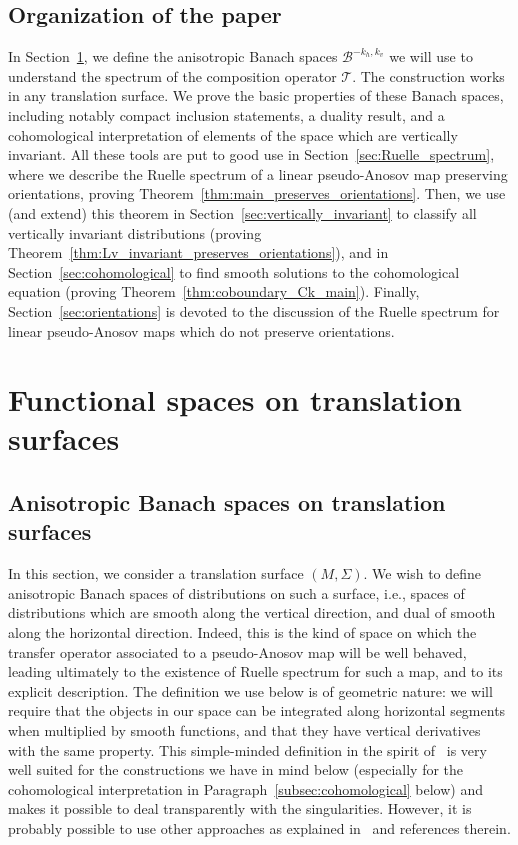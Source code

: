 \documentclass[11pt, a4paper, oneside, final, pagebackref]{amsart}
\newcommand{\boB}{\mathcal{B}}
\newcommand{\boT}{\mathcal{T}}
\theoremstyle{definition}
\numberwithin{equation}{section}
\begin{document}
\subsection*{Organization of the paper}
In Section~\ref{sec:def_boB}, we define the anisotropic Banach spaces
$\boB^{-k_h, k_v}$ we will use to understand the spectrum of the composition
operator $\boT$. The construction works in any translation surface. We prove
the basic properties of these Banach spaces, including notably compact
inclusion statements, a duality result, and a cohomological interpretation of
elements of the space which are vertically invariant. All these tools are put
to good use in Section~\ref{sec:Ruelle_spectrum}, where we describe the
Ruelle spectrum of a linear pseudo-Anosov map preserving orientations,
proving Theorem~\ref{thm:main_preserves_orientations}. Then, we use (and
extend) this theorem in Section~\ref{sec:vertically_invariant} to classify
all vertically invariant distributions (proving
Theorem~\ref{thm:Lv_invariant_preserves_orientations}), and in
Section~\ref{sec:cohomological} to find smooth solutions to the cohomological
equation (proving Theorem~\ref{thm:coboundary_Ck_main}). Finally,
Section~\ref{sec:orientations} is devoted to the discussion of the Ruelle
spectrum for linear pseudo-Anosov maps which do not preserve orientations.


\section{Functional spaces on translation surfaces}
\label{sec:def_boB}

\subsection{Anisotropic Banach spaces on translation surfaces}

\label{subsec:Bkhkv}

In this section, we consider a translation surface $(M, \Sigma)$. We wish to
define anisotropic Banach spaces of distributions on such a surface, i.e.,
spaces of distributions which are smooth along the vertical direction, and
dual of smooth along the horizontal direction. Indeed, this is the kind of
space on which the transfer operator associated to a pseudo-Anosov map will
be well behaved, leading ultimately to the existence of Ruelle spectrum for
such a map, and to its explicit description. The definition we use below is
of geometric nature: we will require that the objects in our space can be
integrated along horizontal segments when multiplied by smooth functions, and
that they have vertical derivatives with the same property. This
simple-minded definition in the spirit of~\cite{GL_Anosov2, avila_gouezel} is
very well suited for the constructions we have in mind below (especially for
the cohomological interpretation in Paragraph~\ref{subsec:cohomological}
below) and makes it possible to deal transparently with the singularities.
However, it is probably possible to use other approaches as explained
in~\cite{baladi_ultimate} and references therein.
\end{document}
